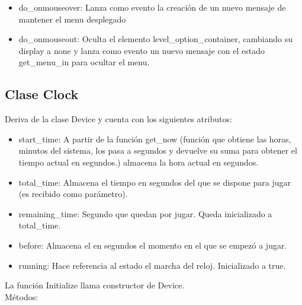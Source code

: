 \begin{itemize}
 \item do\_onmouseover: Lanza como evento la creación de un nuevo mensaje de mantener el menu desplegado

 \item do\_onmouseout: Oculta el elemento level\_option\_container, cambiando su display a none y lanza como evento un nuevo mensaje con el estado 
get\_menu\_in para ocultar el menu.
\end{itemize}


\subsection{Clase Clock}
\label{subsection:clock}

Deriva de la clase Device y cuenta con los siguientes atributos:

\begin{itemize}
 \item start\_time: A partir de la función get\_now (función que obtiene las horas, minutos del sistema, los pasa a segundos y devuelve su suma para 
obtener el tiempo actual en segundos.) almacena la hora actual en segundos.

 \item total\_time: Almacena el tiempo en segundos del que se dispone para jugar (es recibido como parámetro).
 
 \item remaining\_time: Segundo que quedan por jugar. Queda inicializado a total\_time.
 
 \item before: Almacena el en segundos el momento en el que se empezó a jugar.
 
 \item running: Hace referencia al estado el marcha del reloj. Inicializado a true.
\end{itemize}

La función Initialize llama constructor de Device.\\

Métodos:

